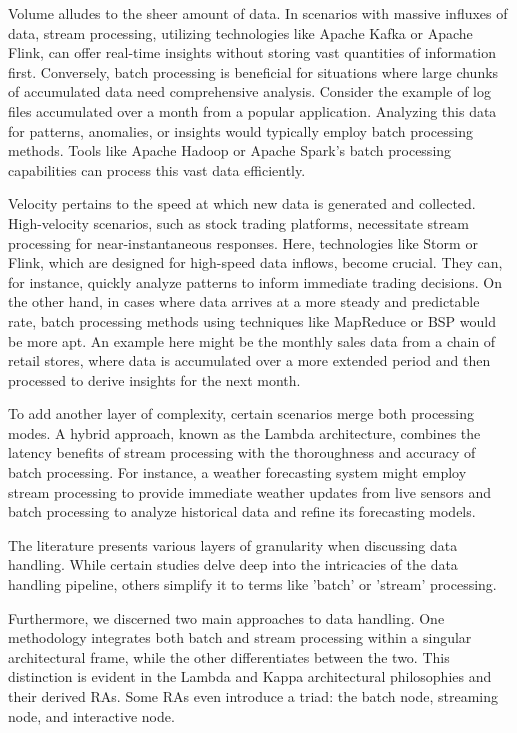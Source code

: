 \documentclass[conference]{IEEEtran}
\begin{document}
Volume alludes to the sheer amount of data. In scenarios with massive influxes of data, stream processing, utilizing technologies like Apache Kafka or Apache Flink, can offer real-time insights without storing vast quantities of information first. Conversely, batch processing is beneficial for situations where large chunks of accumulated data need comprehensive analysis. Consider the example of log files accumulated over a month from a popular application. Analyzing this data for patterns, anomalies, or insights would typically employ batch processing methods. Tools like Apache Hadoop or Apache Spark's batch processing capabilities can process this vast data efficiently.

Velocity pertains to the speed at which new data is generated and collected. High-velocity scenarios, such as stock trading platforms, necessitate stream processing for near-instantaneous responses. Here, technologies like Storm or Flink, which are designed for high-speed data inflows, become crucial. They can, for instance, quickly analyze patterns to inform immediate trading decisions. On the other hand, in cases where data arrives at a more steady and predictable rate, batch processing methods using techniques like MapReduce or BSP would be more apt. An example here might be the monthly sales data from a chain of retail stores, where data is accumulated over a more extended period and then processed to derive insights for the next month.

To add another layer of complexity, certain scenarios merge both processing modes. A hybrid approach, known as the Lambda architecture, combines the latency benefits of stream processing with the thoroughness and accuracy of batch processing. For instance, a weather forecasting system might employ stream processing to provide immediate weather updates from live sensors and batch processing to analyze historical data and refine its forecasting models.

The literature presents various layers of granularity when discussing data handling. While certain studies delve deep into the intricacies of the data handling pipeline, others simplify it to terms like 'batch' or 'stream' processing.

Furthermore, we discerned two main approaches to data handling. One methodology integrates both batch and stream processing within a singular architectural frame, while the other differentiates between the two. This distinction is evident in the Lambda and Kappa architectural philosophies and their derived RAs. Some RAs even introduce a triad: the batch node, streaming node, and interactive node.
\end{document}
